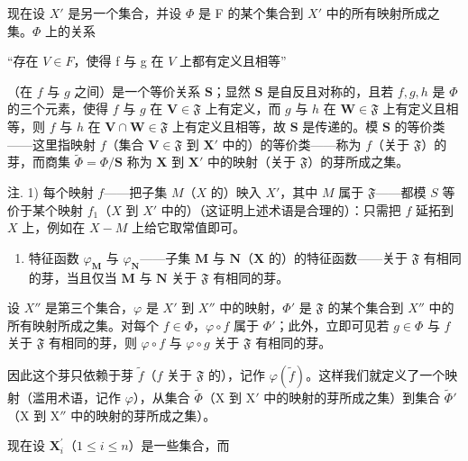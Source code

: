 现在设 \(X'\) 是另一个集合，并设 \(\Phi\) 是 F 的某个集合到 \(X'\) 中的所有映射所成之集。\(\Phi\) 上的关系

“存在 \(V \in F\)，使得 f 与 g 在 \(V\) 上都有定义且相等”

（在 \(f\) 与 \(g\) 之间）是一个等价关系 \(\mathbf{S}\)；显然 \(\mathbf{S}\) 是自反且对称的，且若 \(f, g, h\) 是 \(\Phi\) 的三个元素，使得 \(f\) 与 \(g\) 在 \(\mathbf{V} \in \mathfrak{F}\) 上有定义，而 \(g\) 与 \(h\) 在 \(\mathbf{W} \in \mathfrak{F}\) 上有定义且相等，则 \(f\) 与 \(h\) 在 \(\mathbf{V} \cap \mathbf{W} \in \mathfrak{F}\) 上有定义且相等，故 \(\mathbf{S}\) 是传递的。模 \(\mathbf{S}\) 的等价类——这里指映射 \(f\)（集合 \(\mathbf{V} \in \mathfrak{F}\) 到 \(\mathbf{X}'\) 中的）的等价类——称为 \(f\)（关于 \(\mathfrak{F}\)）的芽，而商集 \(\tilde{\Phi} = \Phi / \mathbf{S}\) 称为 \(\mathbf{X}\) 到 \(\mathbf{X}'\) 中的映射（关于 \(\mathfrak{F}\)）的芽所成之集。

注. 1) 每个映射 \(f\)——把子集 \(M\)（\(X\) 的）映入 \(X'\)，其中 \(M\) 属于 \(\mathfrak{F}\)——都模 \(S\) 等价于某个映射 \(f_1\)（\(X\) 到 \(X'\) 中的）（这证明上述术语是合理的）：只需把 \(f\) 延拓到 \(X\) 上，例如在 \(X - M\) 上给它取常值即可。

\begin{enumerate}
\def\labelenumi{\arabic{enumi})}
\setcounter{enumi}{1}
\tightlist
\item
  特征函数 \(\varphi_{\mathbf{M}}\) 与 \(\varphi_{\mathbf{N}}\)——子集 \(\mathbf{M}\) 与 \(\mathbf{N}\)（\(\mathbf{X}\) 的）的特征函数——关于 \(\mathfrak{F}\) 有相同的芽，当且仅当 \(\mathbf{M}\) 与 \(\mathbf{N}\) 关于 \(\mathfrak{F}\) 有相同的芽。
\end{enumerate}

设 \(X''\) 是第三个集合，\(\varphi\) 是 \(X'\) 到 \(X''\) 中的映射，\(\Phi'\) 是 \(\mathfrak{F}\) 的某个集合到 \(X''\) 中的所有映射所成之集。对每个 \(f \in \Phi\)，\(\varphi \circ f\) 属于 \(\Phi'\)；此外，立即可见若 \(g \in \Phi\) 与 \(f\) 关于 \(\mathfrak{F}\) 有相同的芽，则 \(\varphi \circ f\) 与 \(\varphi \circ g\) 关于 \(\mathfrak{F}\) 有相同的芽。

因此这个芽只依赖于芽 \(\tilde{f}\)（\(f\) 关于 \(\mathfrak{F}\) 的），记作 \(\varphi(\tilde{f})\)。这样我们就定义了一个映射（滥用术语，记作 \(\varphi\)），从集合 \(\tilde{\Phi}\)（X 到 \(\mathrm{X}'\) 中的映射的芽所成之集）到集合 \(\tilde{\Phi}'\)（X 到 \(\mathrm{X}''\) 中的映射的芽所成之集）。

现在设 \(\mathbf{X}_i^{\prime}\)（\(1 \leqslant i \leqslant n\)）是一些集合，而

